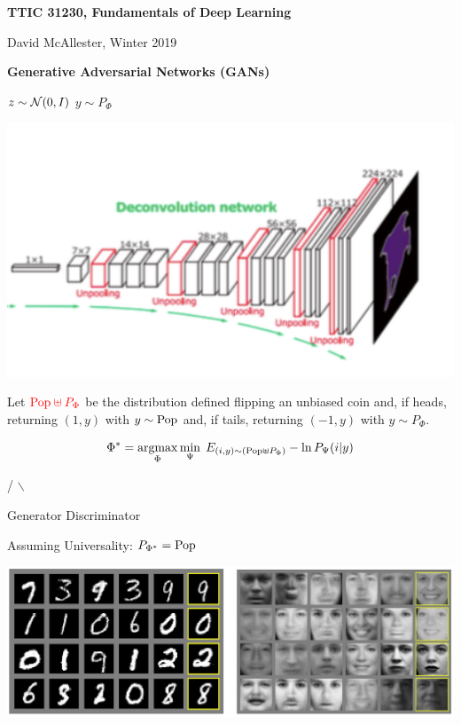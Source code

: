 





{\Huge

  \centerline{\bf TTIC 31230, Fundamentals of Deep Learning}
  \bigskip
  \centerline{David McAllester, Winter 2019}
  \vfill
  \centerline{\bf Generative Adversarial Networks (GANs)}
  \vfill
\vfill
\vfill

\centerline{$z\sim {\cal N}(0,I)$ \hspace{7em} $y\sim P_\Phi$}
\centerline{\includegraphics[width=6in]{../images/halfdeconv}}



Let ${\color{red} \mathrm{Pop} \uplus P_\Phi}$ be the distribution defined flipping an unbiased coin and, if heads, returning {\color{red} $(1,y)$} with
{\color{red} $y \sim \mathrm{Pop}$} and, if tails, returning {\color{red} $(-1,y)$} with {\color{red} $y \sim P_\Phi$}.

{\color{red} $$\Phi^* = \operatorname*{argmax}_\Phi \min_\Psi \;E_{(i,y) \sim (\mathrm{Pop} \uplus P_\Phi)} - \ln P_\Psi(i|y)$$}
\centerline{/\hspace{2.5em} $\backslash$ \hspace{9.5em}~}
\centerline{Generator \hspace{2em}Discriminator \hspace{8em}~}

\vfill
Assuming Universality: {\color{red} $P_{\Phi^*} = \mathrm{Pop}$}

\centerline{\includegraphics[width = 9in]{../images/GAN2014}}

}
